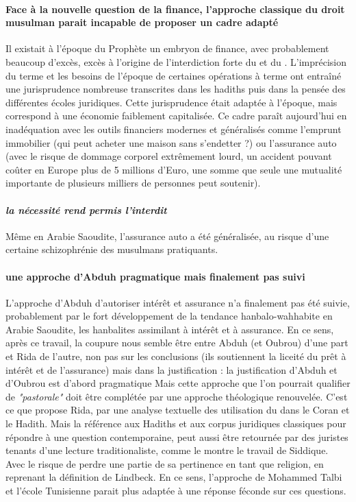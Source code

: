 \paragraph{Face à la nouvelle question de la finance, l'approche classique  du droit musulman parait incapable de proposer un cadre adapté} Il existait à l'époque du Prophète un embryon de finance, avec probablement beaucoup d'excès, excès à l'origine de l'interdiction forte du \riba et du \gharar. L'imprécision du terme \riba et les besoins de l'époque de certaines opérations à terme ont entraîné une jurisprudence nombreuse transcrites dans les hadiths puis dans la pensée des différentes écoles juridiques. Cette jurisprudence était adaptée à l'époque,  mais correspond à une économie faiblement capitalisée. Ce cadre paraît aujourd'hui  en inadéquation avec les outils financiers modernes et généralisés comme l'emprunt immobilier (qui peut acheter une maison sans s'endetter ?) ou l'assurance auto (avec le risque de dommage corporel extrêmement lourd, un accident pouvant coûter en Europe plus de 5 millions d'Euro, une somme que seule une mutualité importante de plusieurs milliers de personnes peut soutenir).  

\paragraph{\textit{la nécessité rend permis l'interdit}} Même en Arabie Saoudite, l'assurance auto a été généralisée, au risque d'une certaine schizophrénie des musulmans pratiquants.

\paragraph{une approche d'Abduh pragmatique mais finalement pas suivi} L'approche d'Abduh d'autoriser intérêt et assurance n'a finalement pas été suivie, probablement par le fort développement de la tendance hanbalo-wahhabite en Arabie Saoudite, les hanbalites assimilant \riba à intérêt et \gharar à assurance. En ce sens, après ce travail, la coupure nous semble être entre Abduh (et Oubrou) d'une part et Rida de l'autre, non pas sur les conclusions (ils soutiennent la liceité du prêt à intérêt et de l'assurance) mais dans la justification :  la justification d'Abduh et d'Oubrou est d'abord pragmatique Mais cette approche que l'on pourrait qualifier de \textit{"pastorale"} doit être complétée par une approche théologique renouvelée. C'est ce que propose Rida, par une analyse textuelle des utilisation du \riba dans le Coran et le Hadith. Mais la référence aux Hadiths et aux corpus juridiques classiques pour répondre à une question contemporaine, peut aussi être retournée par des juristes tenants d'une lecture traditionaliste, comme le montre le travail de Siddique. Avec le risque de perdre une partie de sa pertinence en tant que religion, en reprenant la définition de Lindbeck. En ce sens, l'approche de Mohammed Talbi et l'école Tunisienne parait plus adaptée à une réponse féconde sur ces questions.



